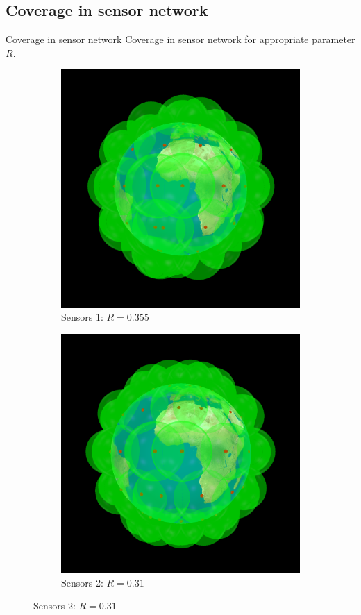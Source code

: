 \documentclass{beamer}
\begin{document}
\subsection{Coverage in sensor network}
\begin{frame}{Coverage in sensor network}
Coverage in sensor network for appropriate parameter $R$.
\begin{figure}[!ht]
\centering
\begin{subfigure}{.5\textwidth}
\centering
\includegraphics[scale=0.15]{used_images/coverage01}
\caption{Sensors 1: $R = 0.355$}
\end{subfigure}%
\begin{subfigure}{.5\textwidth}
\centering
\includegraphics[scale=0.15]{used_images/coverage02}
\caption{Sensors 2: $R = 0.31$}
\end{subfigure}%


\end{figure}
\end{frame}
\end{document}
